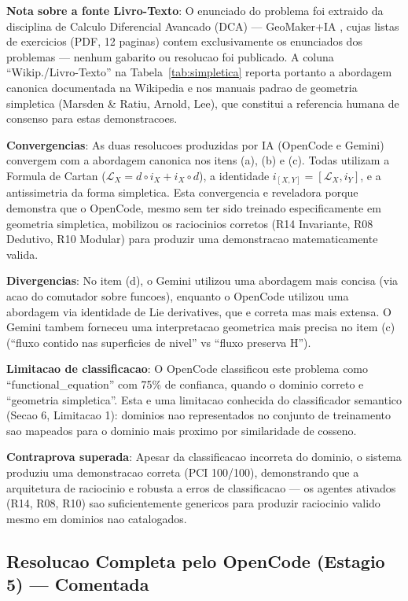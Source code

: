 \documentclass[5p]{elsarticle}
\begin{document}
\textbf{Nota sobre a fonte Livro-Texto}: O enunciado do problema foi extraido da
disciplina de Calculo Diferencial Avancado (DCA) — GeoMaker+IA \cite{dca2026}, cujas
listas de exercicios (PDF, 12 paginas) contem exclusivamente os enunciados dos
problemas --- nenhum gabarito ou resolucao foi publicado. A coluna
``Wikip./Livro-Texto'' na Tabela~\ref{tab:simpletica} reporta portanto a
abordagem canonica documentada na Wikipedia \cite{wiki2026} e nos manuais
padrao de geometria simpletica (Marsden \& Ratiu, Arnold, Lee), que constitui
a referencia humana de consenso para estas demonstracoes.

\textbf{Convergencias}: As duas resolucoes produzidas por IA (OpenCode e Gemini)
convergem com a abordagem canonica nos itens (a), (b) e (c). Todas utilizam a Formula de Cartan ($\mathcal{L}_X =
d \circ i_X + i_X \circ d$), a identidade $i_{[X,Y]} = [\mathcal{L}_X, i_Y]$,
e a antissimetria da forma simpletica. Esta convergencia e reveladora porque
demonstra que o OpenCode, mesmo sem ter sido treinado especificamente em
geometria simpletica, mobilizou os raciocinios corretos (R14 Invariante, R08
Dedutivo, R10 Modular) para produzir uma demonstracao matematicamente valida.

\textbf{Divergencias}: No item (d), o Gemini utilizou uma abordagem mais concisa
(via acao do comutador sobre funcoes), enquanto o OpenCode utilizou uma abordagem
via identidade de Lie derivatives, que e correta mas mais extensa. O Gemini
tambem forneceu uma interpretacao geometrica mais precisa no item (c)
(``fluxo contido nas superficies de nivel'' vs ``fluxo preserva H'').

\textbf{Limitacao de classificacao}: O OpenCode classificou este problema como
``functional\_equation'' com 75\% de confianca, quando o dominio correto e
``geometria simpletica''. Esta e uma limitacao conhecida do classificador
semantico (Secao 6, Limitacao 1): dominios nao representados no conjunto de
treinamento sao mapeados para o dominio mais proximo por similaridade de
cosseno.

\textbf{Contraprova superada}: Apesar da classificacao incorreta do dominio,
o sistema produziu uma demonstracao correta (PCI 100/100), demonstrando que
a arquitetura de raciocinio e robusta a erros de classificacao — os agentes
ativados (R14, R08, R10) sao suficientemente genericos para produzir
raciocinio valido mesmo em dominios nao catalogados.

\subsection{Resolucao Completa pelo OpenCode (Estagio 5) — Comentada}
\end{document}
